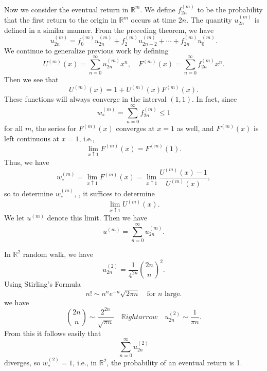 Now we consider the eventual return in $\mathbb{R}^m$. We define $f_{2 n}^{(m)}$ to be the probability that the first return to the origin in $\mathbb{R}^m$ occurs at time $2n$. The quantity $u_{2 n}^{(m)}$ is defined in a similar manner. From the preceding theorem, we have 
\begin{equation*}
    u_{2 n}^{(m)}=f_{0}^{(m)} u_{2 n}^{(m)}+f_{2}^{(m)} u_{2 n-2}^{(m)}+\cdots+f_{2 n}^{(m)} u_{0}^{(m)}.
\end{equation*}
We continue to generalize previous work by defining
\begin{equation*}
    U^{(m)}(x)=\sum_{n=0}^{\infty} u_{2 n}^{(m)} x^{n}, \quad F^{(m)}(x)=\sum_{n=0}^{\infty} f_{2 n}^{(m)} x^{n}.
\end{equation*}
Then we see that 
\begin{equation*}
    U^{(m)}(x)=1+U^{(m)}(x) F^{(m)}(x).
\end{equation*}
These functions will always converge in the interval $(1, 1)$. In fact, since 
\begin{equation*}
    w_{*}^{(m)}=\sum_{n=0}^{\infty} f_{2 n}^{(m)} \leq 1
\end{equation*}
for all $m$, the series for $F^{(m)}(x)$ converges at $x = 1$ as well, and $F^{(m)}(x)$ is left continuous at $x = 1$, i.e.,
\begin{equation*}
    \lim _{x \uparrow 1} F^{(m)}(x)=F^{(m)}(1).
\end{equation*}
Thus, we have
\begin{equation}
    \label{eq:9.2}
    \tag{9-2}
    w_{*}^{(m)}=\lim _{x \uparrow 1} F^{(m)}(x)=\lim _{x \uparrow 1} \frac{U^{(m)}(x)-1}{U^{(m)}(x)},
\end{equation}
so to determine $w_{*}^{(m)}$, , it suffices to determine 
\begin{equation*}
    \lim _{x \uparrow 1} U^{(m)}(x).
\end{equation*}
We let $u^{(m)}$ denote this limit. Then we have 
\begin{equation}
    \label{eq:9.3}
    \tag{9-3}
    u^{(m)}=\sum_{n=0}^{\infty} u_{2 n}^{(m)}.
\end{equation}

In $\mathbb{R}^2$ random walk, we have
\begin{equation*}
    u_{2 n}^{(2)}=\frac{1}{4^{2 n}} \binom{2n}{n}^2. 
\end{equation*}
Using Stirling’s Formula
\begin{equation}
    \label{eq:Stirling}
    \tag{Stirling}
    n! \sim n^n e^{-n} \sqrt{2\pi n} \quad \text{for  $n$  large.}
\end{equation}
we have
\begin{equation*}
    \binom{2n}{n} \sim \frac{2^{2 n}}{\sqrt{\pi n}} \quad \mathbb{R}ightarrow \quad 
    u_{2 n}^{(2)} \sim \frac{1}{\pi n}.
\end{equation*}
From this it follows easily that 
\begin{equation*}
    \sum_{n=0}^{\infty} u_{2 n}^{(2)}
\end{equation*}
diverges, so $w_{*}^{(2)}=1$, i.e., in $\mathbb{R}^2$, the probability of an eventual return is 1.

